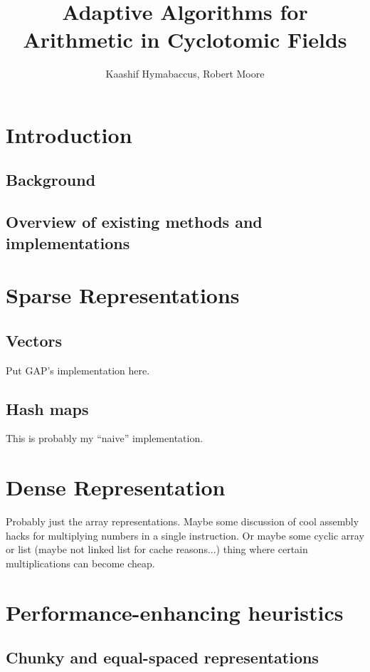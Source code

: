 \documentclass{article}
\title{Adaptive Algorithms for Arithmetic in Cyclotomic Fields}
\author{Kaashif Hymabaccus, Robert Moore}
\begin{document}
\maketitle

\section{Introduction}

\subsection{Background}

\subsection{Overview of existing methods and implementations}

\section{Sparse Representations}

\subsection{Vectors}

Put GAP's implementation here.

\subsection{Hash maps}

This is probably my ``naive'' implementation.

\section{Dense Representation}

Probably just the array representations. Maybe some discussion of cool
assembly hacks for multiplying numbers in a single instruction. Or
maybe some cyclic array or list (maybe not linked list for cache
reasons...) thing where certain multiplications can become cheap.

\section{Performance-enhancing heuristics}

\subsection{Chunky and equal-spaced representations}
\end{document}
